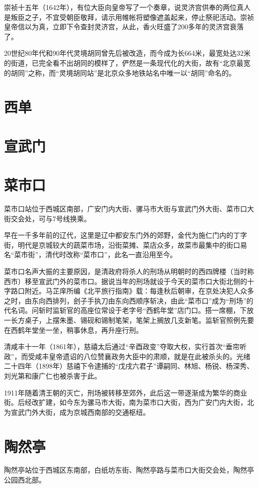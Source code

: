 崇祯十五年（1642年），有位大臣向皇帝写了一个奏章，说灵济宫供奉的两位真人是叛臣之子，不宜受朝臣敬拜，请示用帷帐将塑像遮盖起来，停止祭祀活动。崇祯皇帝信以为真，立即下令查封灵济宫，从此，香火旺盛了200多年的灵济宫衰落了。

20世纪80年代和90年代灵境胡同曾先后被改造，而今成为长664米，最宽处达32米的街道，已完全看不出胡同的模样了，俨然是一条现代化的大街，故有“北京最宽的胡同”之称，而“灵境胡同站”是北京众多地铁站名中唯一以“胡同”命名的。

\section{西单}
\section{宣武门}

\section{菜市口}
菜市口站位于西城区南部，广安门内大街、骡马市大街与宣武门外大街、菜市口大街交会处，可与7号线换乘。

早在一千多年前的辽代，这里是辽中都安东门外的郊野，金代为施仁门内的丁字街，明代是京城较大的蔬菜市场，沿街菜摊、菜店众多，故菜市最集中的街口易名“菜市街”，清代时改称“菜市口”，此名一直沿用至今。

菜市口名声大振的主要原因，是清政府将杀人的刑场从明朝时的西四牌楼（当时称西市）移至宣武门外的菜市口。据说当年的刑场就设于今天的菜市口大街北侧的十字路口附近。马芷庠所编《北平旅行指南》载：每逢秋后朝审，在京处决犯人众多之时，由东向西排列，刽子手执刀由东向西顺序斩决，由此“菜市口”成为“刑场”的代名词。问斩时监斩官的高座位常设于老字号“西鹤年堂”店门口。搭一席棚，下放一长方桌子，上摆朱墨、锡砚和锡制笔架，笔架上搁放几支新笔。监斩官照例先要在西鹤年堂坐一坐，稍事休息，再升座行刑。

清咸丰十一年（1861年），慈禧太后通过“辛酉政变”夺取大权，实行首次“垂帘听政”，而受咸丰皇帝遗诏的八位赞襄政务大臣中的肃顺，就是在此被杀头的。光绪二十四年（1898年）慈禧下令逮捕的“戊戌六君子”谭嗣同、林旭、杨锐、杨深秀、刘光第和康广仁也被杀害于此。

1911年随着清王朝的灭亡，刑场被转移至郊外，此后这一带逐渐成为繁华的商业街。后经改扩建，如今东为骡马市大街，南为菜市口大街，西为广安门内大街，北为宣武门外大街，成为京城西南部的交通枢纽。

\section{陶然亭}
陶然亭站位于西城区东南部，白纸坊东街、陶然亭路与菜市口大街交会处，陶然亭公园西北部。

